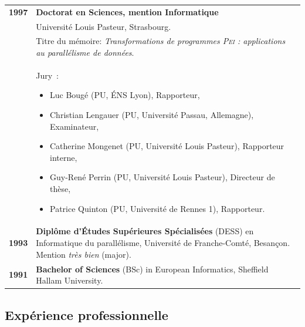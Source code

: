 \documentclass[11pt]{article}
\begin{document}
\begin{tabular}{lp{14.8cm}}
	\textbf{1997} & \textbf{Doctorat en Sciences, mention Informatique}\\
			  & Université Louis Pasteur, Strasbourg.\\
      		  & Titre du mémoire: {\em Transformations de programmes \textsc{Pei} : applications au parallélisme de données}.\\
		        & Jury~:
				\begin{small}
				\begin{itemize}
					\item Luc Bougé (PU, \'{E}NS Lyon), Rapporteur,
			    		\item Christian Lengauer (PU, Université Passau, Allemagne), Examinateur,
					\item Catherine Mongenet (PU, Université Louis Pasteur), Rapporteur interne,
					\item Guy-René Perrin (PU, Université Louis Pasteur), Directeur de thèse,
					\item Patrice Quinton (PU, Université de Rennes 1), Rapporteur.
				\end{itemize}
				\end{small}\\[2mm]
	\textbf{1993} &  \textbf{Diplôme d'\'{E}tudes Supérieures Spécialisées} (DESS) en Informatique du parallélisme, 
				  Université de Franche-Comté, Besançon. Mention {\em très bien} (major).\\[2mm]
	\textbf{1991} &  \textbf{Bachelor of Sciences} (BSc) in European Informatics, Sheffield Hallam University.\\[2mm]

\end{tabular}


\subsection{Expérience professionnelle}
\end{document}
